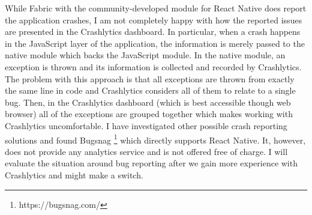 While Fabric with the community-developed module for React Native does report the application crashes, I am not completely happy with how the reported issues are presented in the Crashlytics dashboard. In particular, when a crash happens in the JavaScript layer of the application, the information is merely passed to the native module which backs the JavaScript module. In the native module, an exception is thrown and its information is collected and recorded by Crashlytics. The problem with this approach is that all exceptions are thrown from exactly the same line in code and Crashlytics considers all of them to relate to a single bug. Then, in the Crashlytics dashboard (which is best accessible though web browser) all of the exceptions are grouped together which makes working with Crashlytics uncomfortable. I have investigated other possible crash reporting solutions and found Bugsnag \footnote{https://bugsnag.com/} which directly supports React Native. It, however, does not provide any analytics service and is not offered free of charge. I will evaluate the situation around bug reporting after we gain more experience with Crashlytics and might make a switch.
